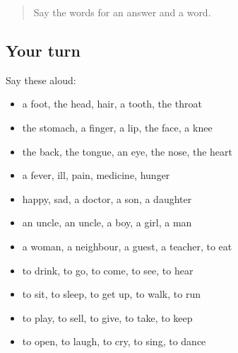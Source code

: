 \label{lesson:MW-R66-first-pass-the-body-family-and-verbs}



\begin{quote}
Say the words for an answer and a word.
\end{quote}

\subsection*{Your turn}
Say these aloud:

\begin{itemize}
\raggedright
  \item a foot, the head, hair, a tooth, the throat
  \item the stomach, a finger, a lip, the face, a knee
  \item the back, the tongue, an eye, the nose, the heart
  \item a fever, ill, pain, medicine, hunger
  \item happy, sad, a doctor, a son, a daughter
  \item an uncle, an uncle, a boy, a girl, a man
  \item a woman, a neighbour, a guest, a teacher, to eat
  \item to drink, to go, to come, to see, to hear
  \item to sit, to sleep, to get up, to walk, to run
  \item to play, to sell, to give, to take, to keep
  \item to open, to laugh, to cry, to sing, to dance
\end{itemize}

